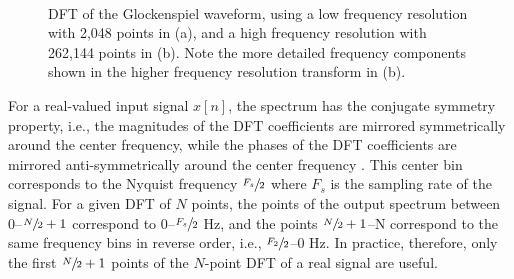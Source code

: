\documentclass[report.tex]{subfiles}
\begin{document}
\begin{figure}[ht]
	\centering
	\\
	\caption{DFT of the Glockenspiel waveform, using a low frequency resolution with 2,048 points in (a), and a high frequency resolution with 262,144 points in (b). Note the more detailed frequency components shown in the higher frequency resolution transform in (b).}
	\label{fig:glockdft}
\end{figure}

For a real-valued input signal $x[n]$, the spectrum has the conjugate symmetry property, i.e., the magnitudes of the DFT coefficients are mirrored symmetrically around the center frequency, while the phases of the DFT coefficients are mirrored anti-symmetrically around the center frequency \parencite{dspfirst}. This center bin corresponds to the Nyquist frequency $\sfrac{F_{s}}{2}$ where $F_{s}$ is the sampling rate of the signal. For a given DFT of $N$ points, the points of the output spectrum between 0--$\sfrac{N}{2}+1$ correspond to 0--$\sfrac{F_{s}}{2}$ Hz, and the points $\sfrac{N}{2}+1$--N correspond to the same frequency bins in reverse order, i.e., $\sfrac{F_{2}}{2}$--0 Hz. In practice, therefore, only the first $\sfrac{N}{2}+1$ points of the $N$-point DFT of a real signal are useful.
\end{document}
